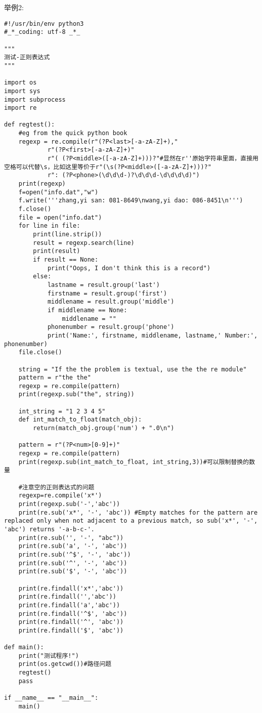\documentclass[twoside,11pt]{book}
\begin{document}
举例2:
\begin{lstlisting}
#!/usr/bin/env python3
#_*_coding: utf-8 _*_

"""
测试-正则表达式
"""

import os
import sys
import subprocess
import re

def regtest():
    #eg from the quick python book
    regexp = re.compile(r"(?P<last>[-a-zA-Z]+),"
            r"(?P<first>[-a-zA-Z]+)"
            r"( (?P<middle>([-a-zA-Z]+)))?"#显然在r''原始字符串里面，直接用空格可以代替\s，比如这里等价于r"(\s(?P<middle>([-a-zA-Z]+)))?"
            r": (?P<phone>(\d\d\d-)?\d\d\d-\d\d\d\d)")
    print(regexp)
    f=open("info.dat","w")
    f.write('''zhang,yi san: 081-8649\nwang,yi dao: 086-8451\n''')
    f.close()
    file = open("info.dat")
    for line in file:
        print(line.strip())
        result = regexp.search(line)
        print(result)
        if result == None:
            print("Oops, I don't think this is a record")
        else:
            lastname = result.group('last')
            firstname = result.group('first')
            middlename = result.group('middle')
            if middlename == None:
                middlename = ""
            phonenumber = result.group('phone')
            print('Name:', firstname, middlename, lastname,' Number:', phonenumber)
    file.close()

    string = "If the the problem is textual, use the the re module"
    pattern = r"the the"
    regexp = re.compile(pattern)
    print(regexp.sub("the", string))

    int_string = "1 2 3 4 5"
    def int_match_to_float(match_obj):
        return(match_obj.group('num') + ".0\n")

    pattern = r"(?P<num>[0-9]+)"
    regexp = re.compile(pattern)
    print(regexp.sub(int_match_to_float, int_string,3))#可以限制替换的数量

    #注意空的正则表达式的问题
    regexp=re.compile('x*')
    print(regexp.sub('-','abc'))
    print(re.sub('x*', '-', 'abc')) #Empty matches for the pattern are replaced only when not adjacent to a previous match, so sub('x*', '-', 'abc') returns '-a-b-c-'.
    print(re.sub('', '-', "abc"))
    print(re.sub('a', '-', 'abc'))
    print(re.sub('^$', '-', 'abc'))
    print(re.sub('^', '-', 'abc'))
    print(re.sub('$', '-', 'abc'))

    print(re.findall('x*','abc'))
    print(re.findall('','abc'))
    print(re.findall('a','abc'))
    print(re.findall('^$', 'abc'))
    print(re.findall('^', 'abc'))
    print(re.findall('$', 'abc'))

def main():
    print("测试程序!")
    print(os.getcwd())#路径问题
    regtest()
    pass

if __name__ == "__main__":
    main()
\end{lstlisting}
\end{document}
